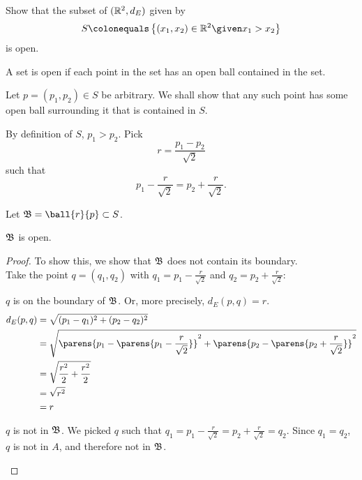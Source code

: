 \begin{problem}
  Show that the subset of $(\mathbb{R}^2, d_E)$ given by
  \[ S \colonequals \set{(x_1, x_2) \in \R^2 \given x_1 > x_2} \]
  is open.
\end{problem}

\begin{answer}
  \begin{definition}
    A set is open if each point in the set has an open ball
    contained in the set.
  \end{definition}

  \step
  Let $p = (p_1, p_2) \in S$ be arbitrary.
  We shall show that any such point has some open ball surrounding it
  that is contained in $S$.
  
  \step
  By definition of $S$, $p_1 > p_2$. Pick \[ r = \frac{p_1 - p_2}{\sqrt{2}} \]
  such that \[ p_1 - \frac{r}{\sqrt{2}} = p_2 + \frac{r}{\sqrt{2}}. \]

  Let $\frakB = \ball{r}{p} \subset S$.

  \begin{claim}
    $\mathfrak{B}$ is open.
    \begin{proof}
      To show this, we show that $\mathfrak{B}$ does not contain its boundary. \\
      Take the point $q = (q_1, q_2)$ with $\displaystyle q_1 = p_1 - \frac{r}{\sqrt{2}}$
      and $\displaystyle q_2 = p_2 + \frac{r}{\sqrt{2}}$:
      
      \begin{enumarabic}
        \item $q$ is on the boundary of $\mathfrak{B}$. Or, more precisely, $d_E(p, q) = r$.
        \begin{align*}
          d_E(p, q) &= \sqrt{(p_1 - q_1)^2 + (p_2 - q_2)^2} \\
                    &= \sqrt{\parens{p_1 - \parens{p_1 - \frac{r}{\sqrt{2}}}}^2 + \parens{p_2 - \parens{p_2 + \frac{r}{\sqrt{2}}}}^2} \\
                    &= \sqrt{\frac{r^2}{2} + \frac{r^2}{2}} \\
                    &= \sqrt{r^2} \\
                    &= r
        \end{align*}

        \item $q$ is not in $\mathfrak{B}$.
          We picked $q$ such that $q_1 = p_1 - \frac{r}{\sqrt{2}} = p_2 + \frac{r}{\sqrt{2}} = q_2$.
          Since $q_1 = q_2$, $q$ is not in $A$, and therefore not in $\mathfrak{B}$.
        

\end{enumarabic}
\end{proof}
\end{claim}
\end{answer}
